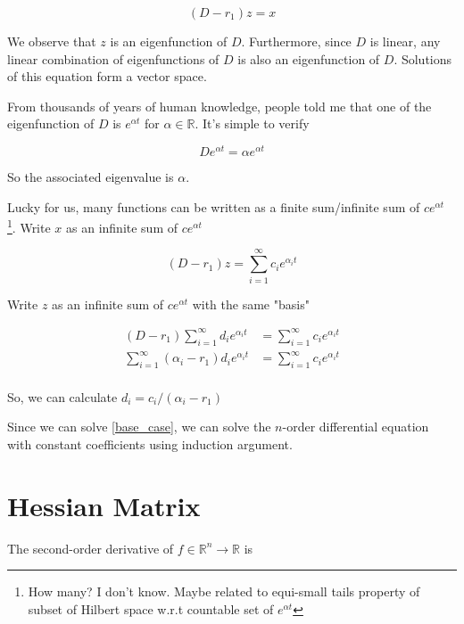 \documentclass{article}
\begin{document}
\begin{equation}
    (D - r_1) z = x
    \label{base_case}
\end{equation}

We observe that $z$ is an eigenfunction of $D$. Furthermore, since $D$ is linear, any linear combination of eigenfunctions of $D$ is also an eigenfunction of $D$. Solutions of this equation form a vector space.

From thousands of years of human knowledge, people told me that one of the eigenfunction of $D$ is $e^{\alpha t}$ for $\alpha \in \mathbb{R}$. It's simple to verify

\begin{equation}
    De^{\alpha t} = \alpha e^{\alpha t}
\end{equation}

So the associated eigenvalue is $\alpha$.

Lucky for us, many functions can be written as a finite sum/infinite sum of $c e^{\alpha t}$ \footnote{How many? I don't know. Maybe related to equi-small tails property of subset of Hilbert space w.r.t countable set of $e^{\alpha t}$}. Write $x$ as an infinite sum of $c e^{\alpha t}$

\begin{equation}
    (D - r_1) z = \sum_{i=1}^\infty c_i e^{\alpha_i t}
\end{equation}

Write $z$ as an infinite sum of $c e^{\alpha t}$ with the same "basis"

\begin{align*}
    (D - r_1) \sum_{i=1}^\infty d_i e^{\alpha_i t}  &= \sum_{i=1}^\infty c_i e^{\alpha_i t} \\
    \sum_{i=1}^\infty (\alpha_i - r_1) d_i  e^{\alpha_i t}  &= \sum_{i=1}^\infty c_i e^{\alpha_i t} \\
\end{align*}

So, we can calculate $d_i = c_i / (\alpha_i - r_1)$

Since we can solve \ref{base_case}, we can solve the $n$-order differential equation with constant coefficients using induction argument.

\section{Hessian Matrix}

The second-order derivative of $f \in \mathbb{R}^n \to \mathbb{R}$ is
\end{document}
